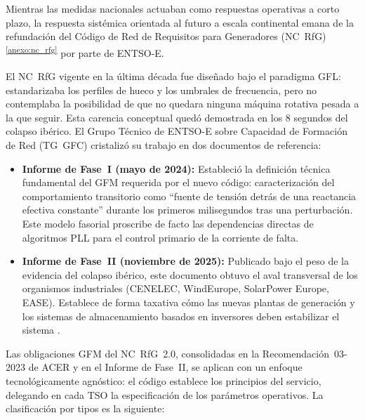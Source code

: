 Mientras las medidas nacionales actuaban como respuestas operativas a
corto plazo, la respuesta sistémica orientada al futuro a escala
continental emana de la refundación del Código de Red de Requisitos para
Generadores (NC~RfG)\textsuperscript{\ref{anexo:nc_rfg}} por parte de
ENTSO-E.

El NC~RfG vigente en la última década fue diseñado bajo el paradigma GFL:
estandarizaba los perfiles de hueco y los umbrales de frecuencia, pero no
contemplaba la posibilidad de que no quedara ninguna máquina rotativa
pesada a la que seguir. Esta carencia conceptual quedó demostrada en los
8 segundos del colapso ibérico. El Grupo Técnico de ENTSO-E sobre
Capacidad de Formación de Red (TG~GFC) cristalizó su trabajo en dos
documentos de referencia:

\begin{itemize}
    \item \textbf{Informe de Fase~I (mayo de 2024):} Estableció la
    definición técnica fundamental del GFM requerida por el nuevo código:
    caracterización del comportamiento transitorio como ``fuente de
    tensión detrás de una reactancia efectiva constante'' durante los
    primeros milisegundos tras una perturbación. Este modelo fasorial
    proscribe de facto las dependencias directas de algoritmos PLL para
    el control primario de la corriente de falta.

    \item \textbf{Informe de Fase~II (noviembre de 2025):} Publicado bajo
    el peso de la evidencia del colapso ibérico, este documento obtuvo el
    aval transversal de los organismos industriales (CENELEC, WindEurope,
    SolarPower Europe, EASE). Establece de forma taxativa cómo las nuevas
    plantas de generación y los sistemas de almacenamiento basados en
    inversores deben estabilizar el sistema \cite{entsoe2025phase2}.
\end{itemize}

Las obligaciones GFM del NC~RfG~2.0, consolidadas en la
Recomendación~03-2023 de ACER y en el Informe de Fase~II, se aplican
con un enfoque tecnológicamente agnóstico: el código establece los
principios del servicio, delegando en cada TSO la especificación de los
parámetros operativos. La clasificación por tipos es la siguiente:

